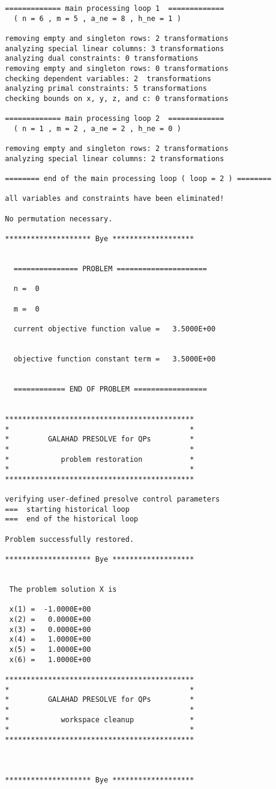\documentclass{galahad}
\begin{document}
{\begin{verbatim}
  ============= main processing loop 1  =============
    ( n = 6 , m = 5 , a_ne = 8 , h_ne = 1 )

  removing empty and singleton rows: 2 transformations
  analyzing special linear columns: 3 transformations
  analyzing dual constraints: 0 transformations
  removing empty and singleton rows: 0 transformations
  checking dependent variables: 2  transformations
  analyzing primal constraints: 5 transformations
  checking bounds on x, y, z, and c: 0 transformations

  ============= main processing loop 2  =============
    ( n = 1 , m = 2 , a_ne = 2 , h_ne = 0 )

  removing empty and singleton rows: 2 transformations
  analyzing special linear columns: 2 transformations

  ======== end of the main processing loop ( loop = 2 ) ========

  all variables and constraints have been eliminated!

  No permutation necessary.

  ******************** Bye *******************


    =============== PROBLEM =====================

    n =  0

    m =  0

    current objective function value =   3.5000E+00


    objective function constant term =   3.5000E+00


    ============ END OF PROBLEM =================


  ********************************************
  *                                          *
  *         GALAHAD PRESOLVE for QPs         *
  *                                          *
  *            problem restoration           *
  *                                          *
  ********************************************

  verifying user-defined presolve control parameters
  ===  starting historical loop
  ===  end of the historical loop

  Problem successfully restored.

  ******************** Bye *******************


   The problem solution X is

   x(1) =  -1.0000E+00
   x(2) =   0.0000E+00
   x(3) =   0.0000E+00
   x(4) =   1.0000E+00
   x(5) =   1.0000E+00
   x(6) =   1.0000E+00

  ********************************************
  *                                          *
  *         GALAHAD PRESOLVE for QPs         *
  *                                          *
  *            workspace cleanup             *
  *                                          *
  ********************************************



  ******************** Bye *******************

\end{verbatim}
}
\end{document}
